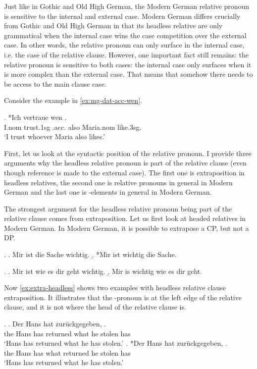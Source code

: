 Just like in Gothic and Old High German, the Modern German relative pronoun is sensitive to the internal and external case. Modern German differs crucially from Gothic and Old High German in that its headless relative are only grammatical when the internal case wins the case competition over the external case. In other words, the relative pronoun can only surface in the internal case, i.e. the case of the relative clause. However, one important fact still remains: the relative pronoun is sensitive to both cases: the internal case only surfaces when it is more complex than the external case. That means that somehow there needs to be access to the main clause case.

Consider the example in \ref{ex:mg-dat-acc-wen}.

\exg. *Ich vertraue wen   . \\
I.\ac{nom} trust.1\ac{sg}\scsub{[dat]} .\ac{acc}. also Maria.\ac{nom} like.3\ac{sg}\scsub{[acc]}.\\
`I trust whoever Maria also likes.' \label{ex:mg-dat-acc-wen}

First, let us look at the syntactic position of the relative pronoun. I provide three arguments why the headless relative pronoun is part of the relative clause (even though reference is made to the external case). The first one is extraposition in headless relatives, the second one is relative pronouns in general in Modern German and the last one is -elements in general in Modern German.

The strongest argument for the headless relative pronoun being part of the relative clause comes from extraposition. Let us first look at headed relatives in Modern German. In Modern German, it is possible to extrapose a CP, but not a DP.

\ex.
\a. Mir ist die Sache wichtig.
\b. *Mir ist wichtig die Sache.

\ex.
\a. Mir ist wie es dir geht wichtig.
\b. Mir is wichtig wie es dir geht.

Now \ref{ex:extra-headless} shows two examples with headless relative clause extraposition. It illustrates that the -pronoun is at the left edge of the relative clause, and it is not where the head of the relative clause is.

\ex.\citet[185]{groos1981}\label{ex:extra-headless}
\ag. Der Hans hat zurückgegeben,    .\\
the Hans has returned what he stolen has\\
\glt `Hans has returned what he has stolen.'\label{ex:extra-headless-good}
\bg. *Der Hans hat  zurückgegeben,   .\\
the Hans has what returned he stolen has\\
\glt `Hans has returned what he has stolen.'\label{ex:extra-headless-bad}

